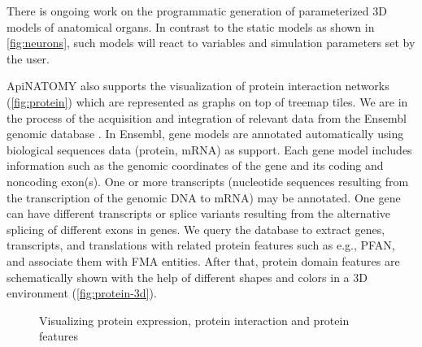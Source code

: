 There is ongoing work on the programmatic generation of parameterized 3D models of anatomical organs. In contrast to the static models as shown in \cref{fig:neurons}, such models will react to variables and simulation parameters set by the user.

ApiNATOMY also supports the visualization of protein interaction networks (\cref{fig:protein}) which are represented as graphs on top of treemap tiles. We are in the process of the acquisition and integration of relevant data from the Ensembl genomic database . In Ensembl, gene models are annotated automatically using biological sequences data (protein, mRNA) as support. Each gene model includes information such as the genomic coordinates of the gene and its coding and noncoding exon(s). One or more transcripts (nucleotide sequences resulting from the transcription of the genomic DNA to mRNA) may be annotated. One gene can have different transcripts or splice variants resulting from the alternative splicing of different exons in genes. We query the database to extract genes, transcripts, and translations with related protein features such as e.g., PFAN, and associate them with FMA entities. After that, protein domain features are schematically shown with the help of different shapes and colors in a 3D environment (\cref{fig:protein-3d}).

\begin{figure} 
\centering
	\caption{Visualizing protein expression, protein interaction and protein features}
	\label{fig:proteins}
\end{figure}
